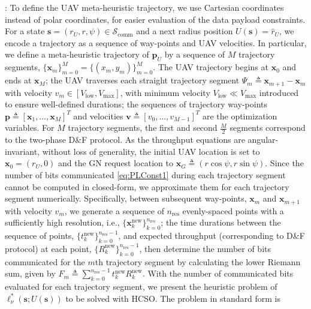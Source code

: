 \documentclass[12pt, draftcls, onecolumn]{IEEEtran}
\theoremstyle{plain}
\theoremstyle{definition}
\theoremstyle{remark}
\begin{document}
: To define the UAV meta-heuristic trajectory, we use Cartesian coordinates instead of polar coordinates, for easier evaluation of the data payload constraints. For a state $\mathbf{s}{=}(r_{U},r,\psi){\in}\mathcal{S}_{\mathrm{comm}}$ and a next radius position $U(\mathbf{s}){=}\hat{r}_{U}$, we encode a trajectory as a sequence of way-points and UAV velocities. In particular, we define a meta-heuristic trajectory of $\mathbf{p}_{U}$ by a sequence of $M$ trajectory segments, $\{\mathbf{x}_{m}\}_{m{=}0}^{M}{=}\{(x_{m},y_{m})\}_{m{=}0}^{M}$. The UAV trajectory begins at $\mathbf{x}_{0}$ and ends at $\mathbf{x}_{M}$; the UAV traverses each straight trajectory segment $\Psi_{m}{\triangleq}\mathbf{x}_{m{+}1}{-}\mathbf{x}_{m}$ with velocity $v_{m}{\in}[V_{\mathrm{low}},V_{\mathrm{max}}]$, with minimum velocity $V_{\mathrm{low}}{\ll}V_{\mathrm{max}}$ introduced to ensure well-defined durations; the sequences of trajectory way-points $\mathbf{p}{\triangleq}[\mathbf{x}_{1},{\dots},\mathbf{x}_{M}]^{T}$ and velocities $\mathbf{v}{\triangleq}[v_{0},{\dots},v_{M{-}1}]^{T}$ are the optimization variables. For $M$ trajectory segments, the first and second $\frac{M}{2}$ segments correspond to the two-phase D\&F protocol. As the throughput equations are angular-invariant, without loss of generality, the initial UAV location is set to $\mathbf{x}_{0}{=}(r_{U},0)$ and the GN request location to $\mathbf{x}_G{\triangleq}(r\cos{\psi},r\sin{\psi})$. Since the number of bits communicated \eqref{eq:PLConst1} during each trajectory segment cannot be computed in closed-form, we approximate them for each trajectory segment numerically. Specifically, between subsequent way-points, $\mathbf{x}_{m}$ and $\mathbf{x}_{m{+}1}$ with velocity $v_{m}$, we generate a sequence of $n_{\mathrm{res}}$ evenly-spaced points with a sufficiently high resolution, i.e., $\{\mathbf{x}_{k}^{\mathrm{new}}\}_{k{=}0}^{n_{\mathrm{res}}}$; the time durations between the sequence of points, $\{t_{k}^{\mathrm{new}}\}_{k{=}0}^{n_{\mathrm{res}}{-}1}$, and expected throughput (corresponding to D\&F protocol) at each point, $\{R_{k}^{\mathrm{new}}\}_{k{=}0}^{n_{\mathrm{res}}{-}1}$, then determine the number of bits communicated for the $m$th trajectory segment by calculating the lower Riemann sum, given by $F_{m}{\triangleq}\sum_{k{=}0}^{n_{\mathrm{res}}{-}1}t_{k}^{\mathrm{new}}R_{k}^{\mathrm{new}}$. With the number of communicated bits evaluated for each trajectory segment, we present the heuristic problem of $\ell_{\nu}^{*}(\mathbf{s};U(\mathbf{s}))$ to be solved with HCSO. The problem in standard form is
\end{document}
